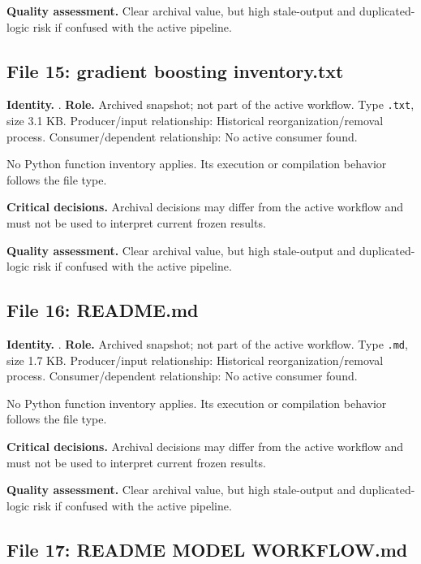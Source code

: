\documentclass[
  11pt,
  a4paper]{article}
\begin{document}
\textbf{Quality assessment.} Clear archival value, but high stale-output
and duplicated-logic risk if confused with the active pipeline.

\subsection{File 15: gradient boosting
inventory.txt}\label{file-2697880842014024596}

\textbf{Identity.}
.
\textbf{Role.} Archived snapshot; not part of the active workflow. Type
\texttt{.txt}, size 3.1 KB. Producer/input relationship: Historical
reorganization/removal process. Consumer/dependent relationship: No
active consumer found.

No Python function inventory applies. Its execution or compilation
behavior follows the file type.

\textbf{Critical decisions.} Archival decisions may differ from the
active workflow and must not be used to interpret current frozen
results.

\textbf{Quality assessment.} Clear archival value, but high stale-output
and duplicated-logic risk if confused with the active pipeline.

\subsection{File 16: README.md}\label{file-1272422465005614684}

\textbf{Identity.}
.
\textbf{Role.} Archived snapshot; not part of the active workflow. Type
\texttt{.md}, size 1.7 KB. Producer/input relationship: Historical
reorganization/removal process. Consumer/dependent relationship: No
active consumer found.

No Python function inventory applies. Its execution or compilation
behavior follows the file type.

\textbf{Critical decisions.} Archival decisions may differ from the
active workflow and must not be used to interpret current frozen
results.

\textbf{Quality assessment.} Clear archival value, but high stale-output
and duplicated-logic risk if confused with the active pipeline.

\subsection{File 17: README MODEL
WORKFLOW.md}\label{file-7644894347913908133}
\end{document}
